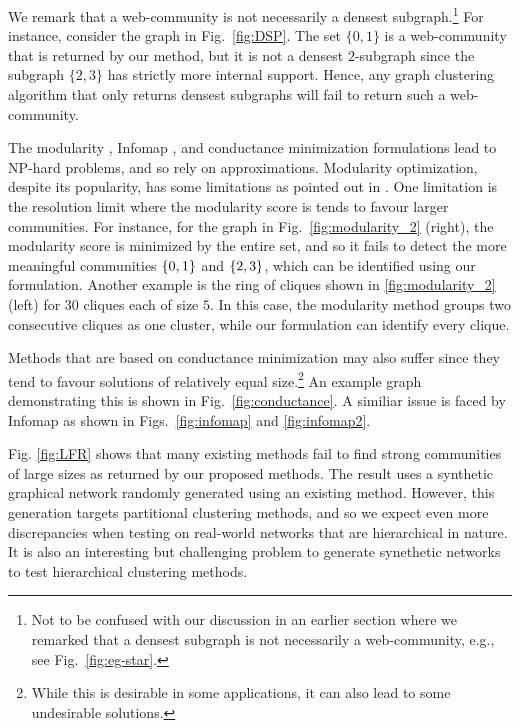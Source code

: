 We remark that a web-community is not necessarily a densest subgraph.\footnote{Not to be confused
	with our discussion in an earlier section where we remarked that a densest subgraph is not necessarily a web-community, e.g., see
	Fig.~\ref{fig:eg-star}.} 
For instance, consider the graph in Fig.~\ref{fig:DSP}.  The set $\{0,1\}$ is a web-community
that is returned by our method, but it is not a densest $2$-subgraph since the subgraph $\{2,3\}$
has strictly more internal support.  Hence, any graph clustering algorithm that only returns densest
subgraphs will fail to return such a web-community.


The modularity \cite{newman2006modularity}, Infomap \cite{rosvall2009map}, and conductance
minimization \cite{shi2000normalized} formulations lead to NP-hard problems, and so rely on
approximations.
Modularity optimization, despite its popularity, has some limitations as pointed out in
\cite{add}. One limitation is the resolution limit where the modularity score is tends to favour larger
communities. 
For instance, for the graph in Fig.~\ref{fig:modularity_2} (right), the  modularity score is
minimized by the entire set, and so it fails to detect the more meaningful communities $\{0,1\}$
and $\{2,3\}$, which can be identified using our formulation.
Another example is  the ring of cliques \cite{add} shown in \ref{fig:modularity_2} (left) for 
$30$ cliques each of size $5$. In this case, the modularity method
groups two consecutive cliques as one cluster, while our formulation can identify every clique.

Methods that are based on conductance minimization may also suffer since they tend to favour solutions of
relatively equal size.\footnote{While this is desirable in some applications, it can also lead to some
undesirable solutions.} An example graph demonstrating this is shown in Fig.~\ref{fig:conductance}.
A similiar issue is faced by Infomap as shown in Figs.~\ref{fig:infomap} and \ref{fig:infomap2}.


Fig. \ref{fig:LFR} shows that many existing methods fail to find strong communities of large sizes
as returned by our proposed methods. The result uses a synthetic graphical network randomly
generated using an existing method. However, this generation targets partitional clustering methods,
and so we expect even more discrepancies when testing on real-world networks that are hierarchical
in nature. It is also an interesting but challenging problem to generate synethetic networks to test
hierarchical clustering methods.





